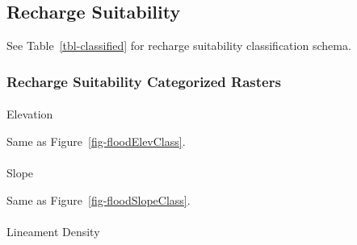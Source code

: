 \documentclass[
]{agujournal2019}
\makeatletter
\let\oldparagraph\paragraph
\renewcommand{\paragraph}{
    \@ifstar
      \xxxParagraphStar
      \xxxParagraphNoStar
  }
\newcommand{\xxxParagraphStar}[1]{\oldparagraph*{#1}\mbox{}}
\newcommand{\xxxParagraphNoStar}[1]{\oldparagraph{#1}\mbox{}}
\makeatother
\begin{document}
\subsection{Recharge Suitability}\label{recharge-suitability}

See Table~\ref{tbl-classified} for recharge suitability classification
schema.

\subsubsection{Recharge Suitability Categorized
Rasters}\label{recharge-suitability-categorized-rasters}

\paragraph{Elevation}\label{elevation-1}

Same as Figure~\ref{fig-floodElevClass}.

\paragraph{Slope}\label{slope-2}

Same as Figure~\ref{fig-floodSlopeClass}.

\paragraph{Lineament Density}\label{lineament-density-2}
\end{document}
